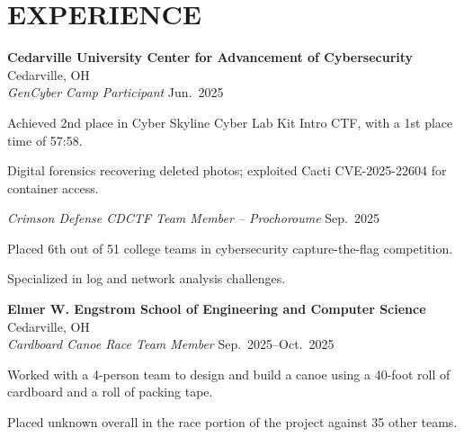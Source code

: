\documentclass[a4paper,10pt]{article}
\makeatletter
\newlength{\mpwidth}
\newenvironment{orgblock}[2]{%
  \par\noindent
  \textbf{#1} \hfill #2\\%
}{%
  \par\vspace{6pt}%
}
\newenvironment{subxp}[2]{%
  \noindent\textit{#1} \hfill #2\\%
  \begin{minipage}[t]{\mpwidth}%
    \begingroup
      \setlength{\leftskip}{0pt}%
      \setlength{\parindent}{0pt}%
      \setlength{\parskip}{0pt}%
      \makeatletter
      \def\my@itemize{%
        \list{\labelitemi}{%
          \setlength{\leftmargin}{0.8em}%
          \setlength{\itemindent}{0pt}%
          \setlength{\labelsep}{0.6em}%
          \setlength{\labelwidth}{0pt}%
          \setlength{\parsep}{0pt}%
          \setlength{\topsep}{0pt}%
          \setlength{\partopsep}{0pt}%
          \setlength{\itemsep}{3pt}%
        }%
      }%
      \makeatother
      \renewcommand{\labelitemi}{\textendash}%
      \my@itemize
}{%
      \endlist
    \endgroup
  \end{minipage}%
  \par\vspace{2pt}%
}
\makeatother
\begin{document}
\section{EXPERIENCE}

\begin{orgblock}{Cedarville University Center for Advancement of Cybersecurity}{Cedarville, OH}
  \begin{subxp}{GenCyber Camp Participant}{Jun.\ 2025}
    \item Achieved 2nd place in Cyber Skyline Cyber Lab Kit Intro CTF, with a 1st place time of 57:58.
    \item Digital forensics recovering deleted photos; exploited Cacti CVE-2025-22604 for container access.
  \end{subxp}

  \begin{subxp}{Crimson Defense CDCTF Team Member -- Prochoroume}{Sep.\ 2025}
    \item Placed 6th out of 51 college teams in cybersecurity capture-the-flag competition.
    \item Specialized in log and network analysis challenges.
  \end{subxp}
\end{orgblock}

\begin{orgblock}{Elmer W. Engstrom School of Engineering and Computer Science}{Cedarville, OH}
  \begin{subxp}{Cardboard Canoe Race Team Member}{Sep.\ 2025--Oct.\ 2025}
    \item Worked with a 4-person team to design and build a canoe using a 40-foot roll of cardboard and a roll of packing tape.
    \item Placed unknown overall in the race portion of the project against 35 other teams.
  \end{subxp}
\end{orgblock}
\end{document}
